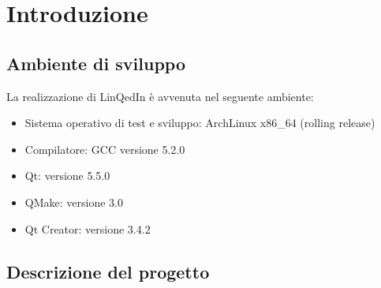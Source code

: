 \section{Introduzione}

\subsection{Ambiente di sviluppo}

La realizzazione di LinQedIn \`e avvenuta nel seguente ambiente:
\begin{itemize}

\item Sistema operativo di test e sviluppo: ArchLinux x86\_64
  (rolling release)
\item Compilatore: GCC versione 5.2.0
\item Qt: versione 5.5.0
\item QMake: versione 3.0
\item Qt Creator: versione 3.4.2

\end{itemize}

 
\subsection{Descrizione del progetto}

